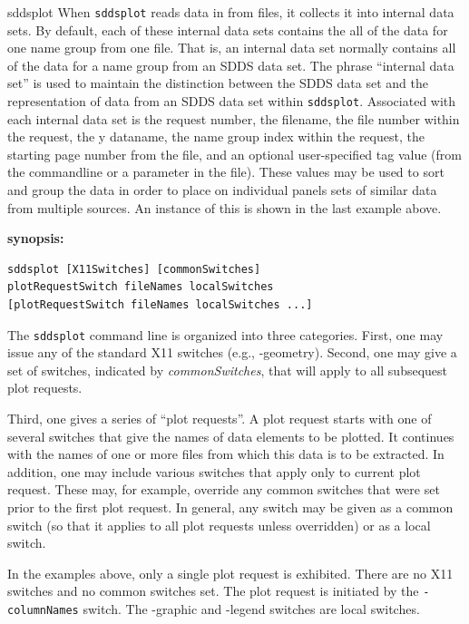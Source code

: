\begin{sddsprog}{sddsplot}
When \verb|sddsplot| reads data in from files, it collects it into internal data sets. By default,
each of these internal data sets contains the all of the data for one name group from one file.  That
is, an internal data set normally contains all of the data for a name group from an SDDS data set.
The phrase ``internal data set'' is used to maintain the distinction between the SDDS data set and
the representation of data from an SDDS data set within \verb|sddsplot|.  Associated with each
internal data set is the request number, the filename, the file number within the request, the y
dataname, the name group index within the request, the starting page number from the file, and an
optional user-specified tag value (from the commandline or a parameter in the file).  These values
may be used to sort and group the data in order to place on individual panels sets of similar data
from multiple sources.  An instance of this is shown in the last example above.

  \item \textbf{synopsis:}
  \begin{verbatim}
sddsplot [X11Switches] [commonSwitches]
plotRequestSwitch fileNames localSwitches
[plotRequestSwitch fileNames localSwitches ...]
  \end{verbatim}

The \verb|sddsplot| command line is organized into three categories.  First, one may issue any of the standard X11
switches (e.g., -geometry).  Second, one may give a set of switches, indicated by {\em commonSwitches}, that will
apply to all subsequest plot requests.

Third, one gives a series of ``plot requests''.  A plot request starts with one of several switches that give the
names of data elements to be plotted.  It continues with the names of one or more files from which this data is to
be extracted.  In addition, one may include various switches that apply only to current plot request.  These may,
for example, override any common switches that were set prior to the first plot request.  In general, any switch
may be given as a common switch (so that it applies to all plot requests unless overridden) or as a local switch.

In the examples above, only a single plot request is exhibited.  There are no X11 switches and no common switches
set.  The plot request is initiated by the {\tt -columnNames} switch.  The {-graphic} and {-legend} switches are
local switches.


\end{sddsprog}
